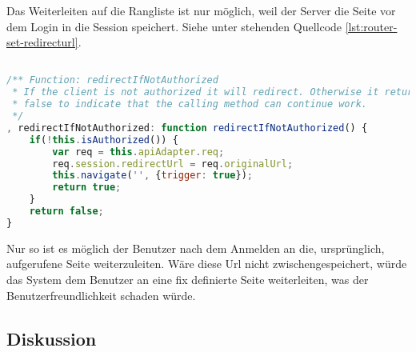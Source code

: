 Das Weiterleiten auf die Rangliste ist nur möglich, weil der Server die Seite vor dem Login in die Session speichert. Siehe unter stehenden Quellcode \ref{lst:router-set-redirecturl}.

\begin{lstlisting}[language=JavaScript, caption=Router - Autorisationskontrolle \cite{roomiesRouter}, label=lst:router-set-redirecturl, firstnumber=225]

/** Function: redirectIfNotAuthorized
 * If the client is not authorized it will redirect. Otherwise it returns
 * false to indicate that the calling method can continue work.
 */
, redirectIfNotAuthorized: function redirectIfNotAuthorized() {
	if(!this.isAuthorized()) {
		var req = this.apiAdapter.req;
		req.session.redirectUrl = req.originalUrl;
		this.navigate('', {trigger: true});
		return true;
	}
	return false;
}
\end{lstlisting}

Nur so ist es möglich der Benutzer nach dem Anmelden an die, ursprünglich, aufgerufene Seite weiterzuleiten. Wäre diese Url nicht zwischengespeichert, würde das System dem Benutzer an eine fix definierte Seite weiterleiten, was der Benutzerfreundlichkeit schaden würde.

\subsection*{Diskussion}
